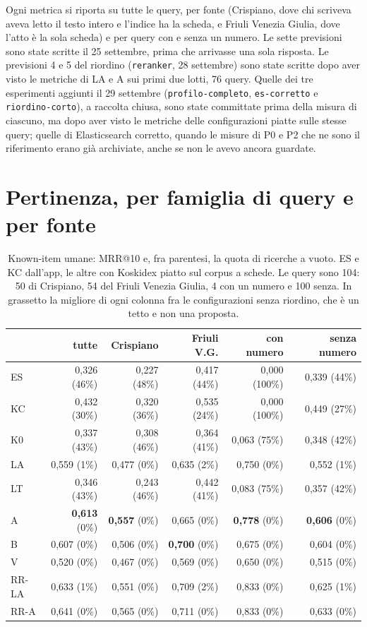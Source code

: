 Ogni metrica si riporta su tutte le query, per fonte (Crispiano, dove chi
scriveva aveva letto il testo intero e l'indice ha la scheda, e Friuli Venezia
Giulia, dove l'atto è la sola scheda) e per query con e senza un numero. Le
sette previsioni sono state scritte il 25 settembre, prima che arrivasse una
sola risposta. Le previsioni 4 e 5 del riordino (\texttt{reranker}, 28 settembre)
sono state scritte dopo aver visto le metriche di LA e A sui primi due lotti, 76
query. Quelle dei tre esperimenti aggiunti il 29 settembre (\texttt{profilo-completo},
\texttt{es-corretto} e \texttt{riordino-corto}), a raccolta chiusa, sono state committate prima della misura di ciascuno, ma dopo aver visto
le metriche delle configurazioni piatte sulle stesse query; quelle di
Elasticsearch corretto, quando le misure di P0 e P2 che ne sono il riferimento
erano già archiviate, anche se non le avevo ancora guardate.

\section{Pertinenza, per famiglia di query e per fonte}\label{sec:pertinenza}

\begin{table}[ht]
  \centering
  \small
  \setlength{\tabcolsep}{4pt}
  \begin{tabular}{lrrrrr}
    \toprule
    & tutte & Crispiano & Friuli V.G. & con numero & senza numero \\
    \midrule
    ES & 0,326 (46\%) & 0,227 (48\%) & 0,417 (44\%) & 0,000 (100\%) & 0,339 (44\%) \\
    KC & 0,432 (30\%) & 0,320 (36\%) & 0,535 (24\%) & 0,000 (100\%) & 0,449 (27\%) \\
    \midrule
    K0 & 0,337 (43\%) & 0,308 (46\%) & 0,364 (41\%) & 0,063 (75\%) & 0,348 (42\%) \\
    LA & 0,559 (1\%) & 0,477 (0\%) & 0,635 (2\%) & 0,750 (0\%) & 0,552 (1\%) \\
    LT & 0,346 (43\%) & 0,243 (46\%) & 0,442 (41\%) & 0,083 (75\%) & 0,357 (42\%) \\
    A & \textbf{0,613} (0\%) & \textbf{0,557} (0\%) & 0,665 (0\%) & \textbf{0,778} (0\%) & \textbf{0,606} (0\%) \\
    B & 0,607 (0\%) & 0,506 (0\%) & \textbf{0,700} (0\%) & 0,675 (0\%) & 0,604 (0\%) \\
    V & 0,520 (0\%) & 0,467 (0\%) & 0,569 (0\%) & 0,650 (0\%) & 0,515 (0\%) \\
    \midrule
    RR-LA & 0,633 (1\%) & 0,551 (0\%) & 0,709 (2\%) & 0,833 (0\%) & 0,625 (1\%) \\
    RR-A & 0,641 (0\%) & 0,565 (0\%) & 0,711 (0\%) & 0,833 (0\%) & 0,633 (0\%) \\
    \bottomrule
  \end{tabular}
  \caption{Known-item umane: MRR@10 e, fra parentesi, la quota di ricerche a
  vuoto. ES e KC dall'app, le altre con Koskidex piatto sul corpus a schede.
  Le query sono 104: 50 di Crispiano, 54 del Friuli Venezia Giulia, 4 con un
  numero e 100 senza. In grassetto la migliore di ogni colonna fra le
  configurazioni senza riordino, che è un tetto e non una proposta.}
  \label{tab:known-item-umane}
\end{table}

